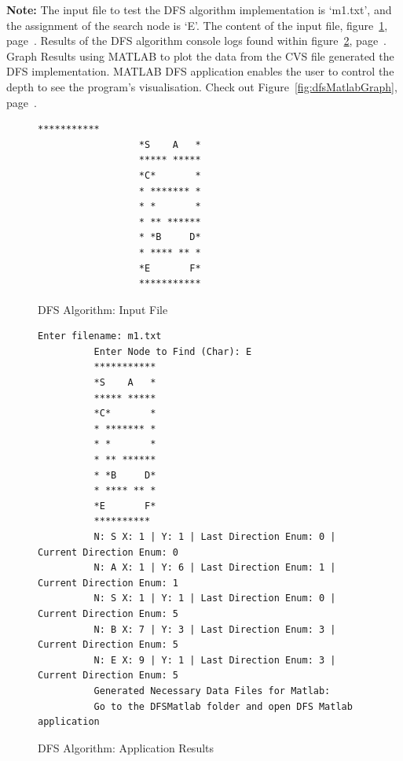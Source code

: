 \documentclass[conference]{IEEEtran}
\begin{document}
      \textbf{Note:} The input file to test the DFS algorithm implementation is ‘m1.txt’, and the assignment of the search node is ‘E’. The content of the input file, figure~\ref{lstlisting:dfsInput}, page~\pageref{lstlisting:dfsInput}. Results of the DFS algorithm console logs found within figure~\ref{lstlisting:dfsApplicationResults}, page~\pageref{lstlisting:dfsApplicationResults}. Graph Results using MATLAB to plot the data from the CVS file generated the DFS implementation. MATLAB DFS application enables the user to control the depth to see the program's visualisation. Check out Figure~\ref{fig:dfsMatlabGraph}, page~\pageref{fig:dfsMatlabGraph}.
      \begin{figure}[h]
        \begin{lstlisting}[columns=fixed]
                  ***********
                  *S    A   *
                  ***** *****
                  *C*       *
                  * ******* *
                  * *       *
                  * ** ******
                  * *B     D*
                  * **** ** *
                  *E       F*
                  ***********
        \end{lstlisting}
        \caption{DFS Algorithm: Input File}
        \label{lstlisting:dfsInput}
      \end{figure}

      \begin{figure}[ht]
        \begin{lstlisting}[columns=fixed]
          Enter filename: m1.txt
          Enter Node to Find (Char): E
          ***********
          *S    A   *
          ***** *****
          *C*       *
          * ******* *
          * *       *
          * ** ******
          * *B     D*
          * **** ** *
          *E       F*
          **********
          N: S X: 1 | Y: 1 | Last Direction Enum: 0 | Current Direction Enum: 0
          N: A X: 1 | Y: 6 | Last Direction Enum: 1 | Current Direction Enum: 1
          N: S X: 1 | Y: 1 | Last Direction Enum: 0 | Current Direction Enum: 5
          N: B X: 7 | Y: 3 | Last Direction Enum: 3 | Current Direction Enum: 5
          N: E X: 9 | Y: 1 | Last Direction Enum: 3 | Current Direction Enum: 5
          Generated Necessary Data Files for Matlab:
          Go to the DFSMatlab folder and open DFS Matlab application
        \end{lstlisting}
        \caption{DFS Algorithm: Application Results}
        \label{lstlisting:dfsApplicationResults}
      \end{figure}
\end{document}
